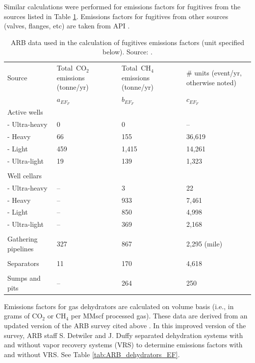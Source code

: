 \documentclass[11pt]{report}
\begin{document}
{{{{Similar calculations were performed for emissions factors for fugitives from the sources listed in Table \ref{tab:ARB_fugitives_EF}. Emissions factors for fugitives from other sources (valves, flanges, etc) are taken from API \cite[p. 20]{API1996b}. 
\begin{table}
\begin{scriptsize}
\caption{ARB data used in the calculation of fugitives emissions factors (unit specified below). Source: \cite{Lee2011}.}
\label{tab:ARB_fugitives_EF}
\begin{threeparttable}
\begin{tabular*}{0.9\columnwidth}{p{}p{}p{}p{}}
\toprule
Source & Total\,\,\,CO$_{2}$ \quad \quad emissions (tonne/yr) & Total\,\,\,CH$_{4}$ \quad\quad\quad emissions \quad\quad\quad (tonne/yr) & \# units (event/yr, otherwise noted) \\
& $a_{EF_F}$ & $b_{EF_F}$ & $c_{EF_F}$\\
\midrule
Active wells & & & \\
\quad - Ultra-heavy & 0 & 0 & -- \\
\quad - Heavy & 66 & 155 & 36,619 \\
\quad - Light & 459 & 1,415 & 14,261 \\
\quad - Ultra-light & 19 & 139 & 1,323 \\
\\
Well cellars & & & \\ 
\quad - Ultra-heavy & -- & 3 & 22 \\
\quad - Heavy & -- & 933 & 7,461 \\
\quad - Light & -- & 850 & 4,998 \\
\quad - Ultra-light & -- & 369 & 2,168 \\

\\
Gathering pipelines & 327 & 867 & 2,295 (mile) \\
\\
Separators & 11 & 170 & 4,618 \\
\\
Sumps and pits & -- & 264 & 250 \\
\bottomrule
\end{tabular*}
\end{threeparttable}
\end{scriptsize}
\end{table}

Emissions factors for gas dehydrators are calculated on volume basis (i.e., in grams of CO$_2$ or CH$_4$ per MMscf processed gas). These data are derived from an updated version of the ARB survey cited above \cite{ARB2013}. In this improved version of the survey, ARB staff S. Detwiler and J. Duffy separated dehydration systems with and without vapor recovery systems (VRS) to determine emissions factors with and without VRS. See Table \ref{tab:ARB_dehydrators_EF}.


}}}}
\end{document}
